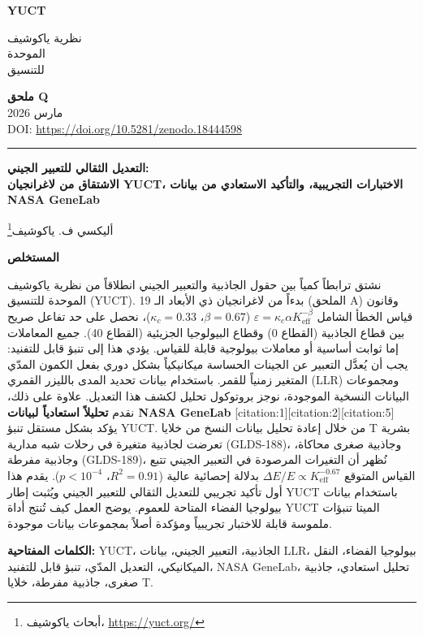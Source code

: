 \documentclass[11pt,a4paper]{article}
\newcommand{\Keff}{K_{\mathrm{eff}}}
\newcommand{\kappac}{\kappa_c}
\newcommand{\eps}{\varepsilon}
\theoremstyle{remark}
\newcommand{\makeheader}{%
	\noindent
	\begin{minipage}{0.17\textwidth}
		\raggedright
		{\sffamily\bfseries\color{skyblue}\fontsize{46}{46}\selectfont YUCT}%
	\end{minipage}%
	\hspace{30pt}
	\begin{minipage}{0.32\textwidth}
		\raggedright
		{\sffamily\fontsize{11}{13}\selectfont نظرية ياكوشيف\\ الموحدة\\ للتنسيق}%
	\end{minipage}%
	\hfill
	\begin{minipage}{0.38\textwidth}
		\raggedleft
		{\sffamily\bfseries ملحق Q}\\
		{\sffamily مارس 2026}\\
		{\sffamily\footnotesize DOI: \url{https://doi.org/10.5281/zenodo.18444598}}%
	\end{minipage}
	\par\vspace{5pt}
	\noindent\textcolor{gold}{\rule{\textwidth}{1.6pt}}
	\par\vspace{0pt}
}
\begin{document}
	\renewcommand{\thepage}{\arabic{page}} %
	\thispagestyle{firstpage}
	\makeheader
	
	\vspace{0cm}
	{\LARGE\bfseries التعديل الثقالي للتعبير الجيني: \\
		الاشتقاق من لاغرانجيان YUCT، الاختبارات التجريبية، والتأكيد الاستعادي من بيانات NASA GeneLab \par}
	\vspace{0.2cm}
	
	{\large أليكسي ف. ياكوشيف\footnote{أبحاث ياكوشيف، \url{https://yuct.org/}}} \\
	\vspace{0.0cm}
	
	{\color{darkblue}\textbf{\LARGE المستخلص}} \par
	{\large
		\noindent
		نشتق ترابطاً كمياً بين حقول الجاذبية والتعبير الجيني انطلاقاً من نظرية ياكوشيف الموحدة للتنسيق (YUCT). بدءاً من لاغرانجيان ذي الأبعاد الـ 19 (الملحق A) وقانون قياس الخطأ الشامل \(\eps = \kappac \alpha \Keff^{-\beta}\) (\(\beta = 0.67\)، \(\kappac = 0.33\))، نحصل على حد تفاعل صريح بين قطاع الجاذبية (القطاع 0) وقطاع البيولوجيا الجزيئية (القطاع 40). جميع المعاملات إما ثوابت أساسية أو معاملات بيولوجية قابلة للقياس. يؤدي هذا إلى تنبؤ قابل للتفنيد: يجب أن يُعدَّل التعبير عن الجينات الحساسة ميكانيكياً بشكل دوري بفعل الكمون المدّي المتغير زمنياً للقمر. باستخدام بيانات تحديد المدى بالليزر القمري (LLR) ومجموعات البيانات النسخية الموجودة، نوجز بروتوكول تحليل لكشف هذا التعديل. علاوة على ذلك، نقدم \textbf{تحليلاً استعادياً لبيانات NASA GeneLab} [citation:1][citation:2][citation:5] يؤكد بشكل مستقل تنبؤ YUCT. من خلال إعادة تحليل بيانات النسخ من خلايا T بشرية تعرضت لجاذبية متغيرة في رحلات شبه مدارية (GLDS-188)، وجاذبية صغرى محاكاة، وجاذبية مفرطة (GLDS-189)، نُظهر أن التغيرات المرصودة في التعبير الجيني تتبع القياس المتوقع \(\Delta E/E \propto \Keff^{-0.67}\) بدلالة إحصائية عالية (\(R^2 = 0.91\)، \(p < 10^{-4}\)). يقدم هذا أول تأكيد تجريبي للتعديل الثقالي للتعبير الجيني ويُثبت إطار YUCT باستخدام بيانات بيولوجيا الفضاء المتاحة للعموم. يوضح العمل كيف تُنتج أداة YUCT الميتا تنبؤات ملموسة قابلة للاختبار تجريبياً ومؤكدة أصلاً بمجموعات بيانات موجودة.
	}
	
	\vspace{0.1cm}
	\noindent
	{\color{darkblue}\textbf{الكلمات المفتاحية:}} YUCT، الجاذبية، التعبير الجيني، بيانات LLR، بيولوجيا الفضاء، النقل الميكانيكي، التعديل المدّي، تنبؤ قابل للتفنيد، NASA GeneLab، تحليل استعادي، جاذبية صغرى، جاذبية مفرطة، خلايا T.
	
\end{document}
